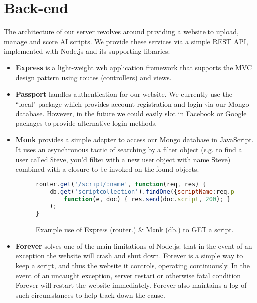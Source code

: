 \begin{center}
\end{center}

\section{Back-end}
The architecture of our server revolves around providing a website to upload, manage and score AI scripts. We provide these services via a simple REST API, implemented with Node.js\cite{whynode} and its supporting libraries:
	\begin{itemize}
	        \item \textbf{Express}\cite{express} is a light-weight web application framework that supports the MVC design pattern using routes (controllers) and views.  
		\item \textbf{Passport}\cite{passport} handles authentication for our website. We currently use the ``local" package which provides account registration and login via our Mongo database. However, in the future we could easily slot in Facebook or Google packages to provide alternative login methods.	
		\item \textbf{Monk}\cite{monk} provides a simple adapter to access our Mongo database in JavaScript. It uses an asynchronous tactic of searching by a filter object (e.g. to find a user called Steve, you'd filter with a new user object with name Steve) combined with a closure to be invoked on the found objects. 
\begin{figure}[H]
\centering
\begin{lstlisting}[language=JavaScript]
router.get('/script/:name', function(req, res) {
    db.get('scriptcollection').findOne({scriptName:req.params.name},  
        function(e, doc) { res.send(doc.script, 200); }
    );
}
\end{lstlisting}
\caption{Example use of Express (router.) \& Monk (db.) to GET a script.}
\label{fig:getscript}
\end{figure}
		
		\item \textbf{Forever} solves one of the main limitations of Node.js: that in the event of an exception the website will crash and shut down. Forever is a simple way to keep a script, and thus the website it controls, operating continuously. In the event of an uncaught exception, server restart or otherwise fatal condition Forever will restart the website immediately. Forever also maintains a log of such circumstances to help track down the cause.
	\end{itemize}

